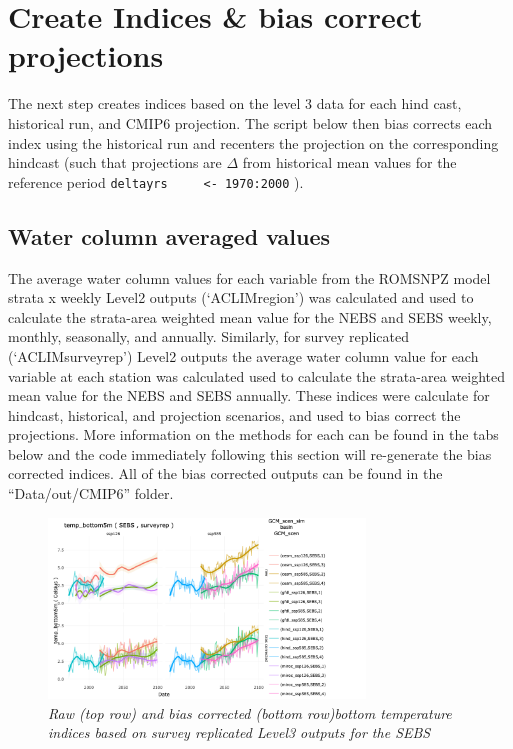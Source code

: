 \documentclass[
]{article}
\begin{document}
\hypertarget{create-indices-bias-correct-projections}{%
\section{Create Indices \& bias correct
projections}\label{create-indices-bias-correct-projections}}

The next step creates indices based on the level 3 data for each hind
cast, historical run, and CMIP6 projection. The script below then bias
corrects each index using the historical run and recenters the
projection on the corresponding hindcast (such that projections are
\(\Delta\) from historical mean values for the reference period
\texttt{deltayrs\ \ \ \ \ \textless{}-\ 1970:2000} ).

\hypertarget{water-column-averaged-values}{%
\subsection{Water column averaged
values}\label{water-column-averaged-values}}

The average water column values for each variable from the ROMSNPZ model
strata x weekly Level2 outputs (`ACLIMregion') was calculated and used
to calculate the strata-area weighted mean value for the NEBS and SEBS
weekly, monthly, seasonally, and annually. Similarly, for survey
replicated (`ACLIMsurveyrep') Level2 outputs the average water column
value for each variable at each station was calculated used to calculate
the strata-area weighted mean value for the NEBS and SEBS annually.
These indices were calculate for hindcast, historical, and projection
scenarios, and used to bias correct the projections. More information on
the methods for each can be found in the tabs below and the code
immediately following this section will re-generate the bias corrected
indices. All of the bias corrected outputs can be found in the
``Data/out/CMIP6'' folder.

\begin{figure}
\centering
\includegraphics[width=0.75\textwidth,height=\textheight]{Figs/biascorrected_temp2.png}
\caption{\emph{Raw (top row) and bias corrected (bottom row)bottom
temperature indices based on survey replicated Level3 outputs for the
SEBS}}
\end{figure}
\end{document}
